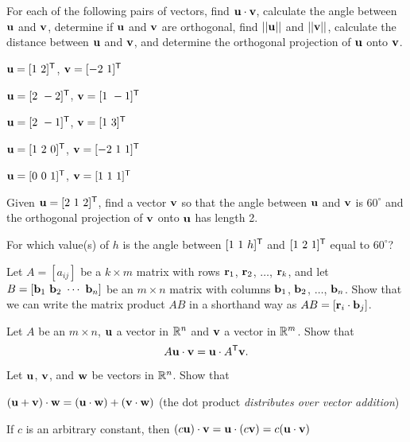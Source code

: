 \be
\item For each of the following pairs of vectors, find $\mathbf{u} \cdot \mathbf{v}$, calculate the angle between $\mathbf{u}$ and $\mathbf{v}$, determine if $\mathbf{u}$ and $\mathbf{v}$ are orthogonal, find $||\mathbf{u}||$ and $||\mathbf{v}||$, calculate the distance between $\mathbf{u}$ and $\mathbf{v}$, and determine the orthogonal  projection of $\mathbf{u}$ onto $\mathbf{v}$. 
	\ba
	\item $\mathbf{u} = [1 \ 2]^{\mathsf{T}}$, $\mathbf{v} = [-2 \ 1]^{\mathsf{T}}$
	\item $\mathbf{u} = [2 \ -2]^{\mathsf{T}}$, $\mathbf{v} = [1 \ -1]^{\mathsf{T}}$
	\item $\mathbf{u} = [2 \ -1]^{\mathsf{T}}$, $\mathbf{v} = [1 \ 3]^{\mathsf{T}}$
	\item $\mathbf{u} = [1 \ 2 \ 0]^{\mathsf{T}}$, $\mathbf{v} = [-2 \ 1 \ 1]^{\mathsf{T}}$
	\item $\mathbf{u} = [0 \ 0 \ 1]^{\mathsf{T}}$, $\mathbf{v} = [1 \ 1 \ 1]^{\mathsf{T}}$
	\ea

\item Given $\mathbf{u}=[2 \ 1\ 2]^{\mathsf{T}}$, find a vector $\mathbf{v}$ so that the angle between $\mathbf{u}$ and $\mathbf{v}$ is $60^\circ$ and the orthogonal projection of $\mathbf{v}$ onto $\mathbf{u}$ has length 2.


\item For which value(s) of $h$ is the angle between $[1\ 1\ h]^{\mathsf{T}}$ and $[1\ 2\ 1]^{\mathsf{T}}$ equal to $60^\circ$?

\item Let $A = [a_{ij}]$ be a $k \times m$ matrix with rows $\mathbf{r}_1$, $\mathbf{r}_2$, $\ldots$, $\mathbf{r}_k$, and let $B =  [\mathbf{b}_1 \ \mathbf{b}_2 \ \cdots \ \mathbf{b}_n]$ be an $m \times n$ matrix with columns $\mathbf{b}_1$, $\mathbf{b}_2$, $\ldots$, $\mathbf{b}_n$. Show that we can write the matrix product $AB$ in a shorthand way as $AB = [\mathbf{r}_i \cdot \mathbf{b}_j]$. 


\item Let $A$ be an $m \times n$, $\mathbf{u}$ a vector in $\mathbb{R}^n$ and $\mathbf{v}$ a vector in $\mathbb{R}^m$. Show that 
\[A\mathbf{u} \cdot \mathbf{v} = \mathbf{u} \cdot A^{\mathsf{T}} \mathbf{v}.\]


\item Let $\mathbf{u}$, $\mathbf{v}$, and $\mathbf{w}$ be vectors in $\mathbb{R}^n$. Show that 
	\ba
	\item $(\mathbf{u} + \mathbf{v}) \cdot \mathbf{w} = (\mathbf{u} \cdot \mathbf{w}) + (\mathbf{v} \cdot \mathbf{w})$ (the dot product \emph{distributes over vector addition})
	\item If $c$ is an arbitrary constant, then $(c\mathbf{u}) \cdot \mathbf{v} = \mathbf{u} \cdot (c\mathbf{v}) = c(\mathbf{u} \cdot \mathbf{v})$
	\ea

